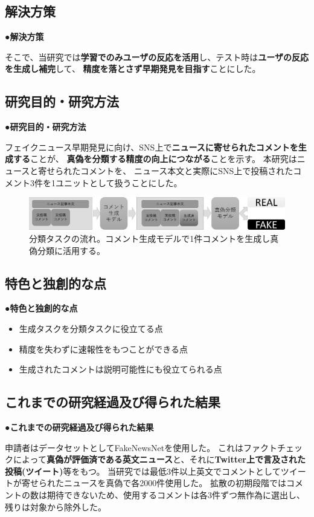 {	\subsection{解決方策}
	●\textbf{解決方策}

	そこで、当研究では\textbf{学習でのみユーザの反応を活用}し、テスト時は\textbf{ユーザの反応を生成し補完}して、
	\textbf{精度を落とさず早期発見を目指す}ことにした。

	\subsection{研究目的・研究方法}
	●\textbf{研究目的・研究方法}

	フェイクニュース早期発見に向け、SNS上で\textbf{ニュースに寄せられたコメントを生成する}ことが、
	\textbf{真偽を分類する精度の向上につながる}ことを示す。
	本研究はニュースと寄せられたコメントを、
	ニュース本文と実際にSNS上で投稿されたコメント3件を1ユニットとして扱うことにした。
	
	\begin{figure}[ht]
		\centering
		\includegraphics[width=0.95\linewidth]{model.pdf}
		\caption{分類タスクの流れ。コメント生成モデルで1件コメントを生成し真偽分類に活用する。}
		\label{fig:model}
	\end{figure}

	\subsection{特色と独創的な点}
	●\textbf{特色と独創的な点}
	
	\begin{itemize}
		\item 生成タスクを分類タスクに役立てる点
		\item 精度を失わずに速報性をもつことができる点
		\item 生成されたコメントは説明可能性にも役立てられる点
	\end{itemize}

	\subsection{これまでの研究経過及び得られた結果}
	●\textbf{これまでの研究経過及び得られた結果}

	申請者はデータセットとしてFakeNewsNet\cite{Shu2018FakeNewsNetAD}を使用した。
	これはファクトチェックによって\textbf{真偽が評価済である英文ニュース}と、それに\textbf{Twitter上で言及された投稿(ツイート)}等をもつ。
	当研究では最低3件以上英文でコメントとしてツイートが寄せられたニュースを真偽で各2000件使用した。
	拡散の初期段階ではコメントの数は期待できないため、使用するコメントは各3件ずつ無作為に選出し、残りは対象から除外した。

}
